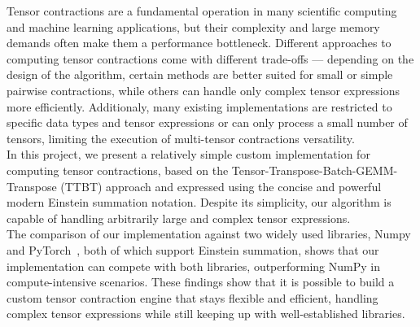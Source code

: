 Tensor contractions are a fundamental operation in many scientific computing and machine learning applications, but their complexity and large memory demands often make them a performance bottleneck.
Different approaches to computing tensor contractions come with different trade-offs — depending on the design of the algorithm, certain methods are better suited for small or simple pairwise contractions, while others can handle only complex tensor expressions more efficiently.
Additionaly, many existing implementations are restricted to specific data types and tensor expressions or  can only process a small number of tensors, limiting the execution of multi-tensor contractions versatility.\\
In this project, we present a relatively simple custom implementation for computing tensor contractions, based on the Tensor-Transpose-Batch-GEMM-Transpose (TTBT) approach and expressed using the concise and powerful modern Einstein summation notation. Despite its simplicity, our algorithm is capable of handling arbitrarily large and complex tensor expressions.\\
The comparison of our implementation against two widely used libraries, Numpy~\cite{Numpy} and PyTorch~\cite{PyTorch}, both of which support Einstein summation, shows that our implementation can compete with both libraries, outperforming NumPy in compute-intensive scenarios. These findings show that it is possible to build a custom tensor contraction engine that stays flexible and efficient, handling complex tensor expressions while still keeping up with well-established libraries.
